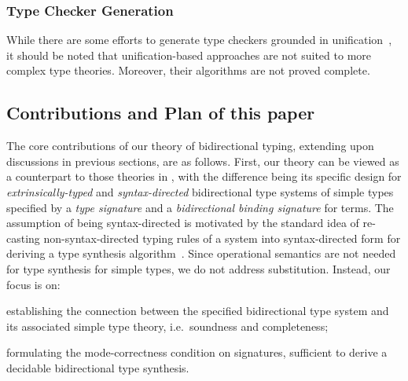 \subsubsection{Type Checker Generation}
While there are some efforts to generate type checkers grounded in unification~\citep{Gast2004,Grewe2015}, it should be noted that unification-based approaches are not suited to more complex type theories.
Moreover, their algorithms are not proved complete.

\subsection{Contributions and Plan of this paper}
The core contributions of our theory of bidirectional typing, extending upon discussions in previous sections, are as follows.
First, our theory can be viewed as a counterpart to those theories in , with the difference being its specific design for \emph{extrinsically-typed} and \emph{syntax-directed} bidirectional type systems of simple types specified by a \emph{type signature} and a \emph{bidirectional binding signature} for terms.
The assumption of being syntax-directed is motivated by the standard idea of re-casting non-syntax-directed typing rules of a system into syntax-directed form for deriving a type synthesis algorithm~\cite{Peyton-Jones2007}.
Since operational semantics are not needed for type synthesis for simple types, we do not address substitution. Instead, our focus is on:
\begin{enumerate*}
  \item establishing the connection between the specified bidirectional type system and its associated simple type theory, i.e.\ soundness and completeness; 
  \item formulating the mode-correctness condition on signatures, sufficient to derive a decidable bidirectional type synthesis.
\end{enumerate*}

